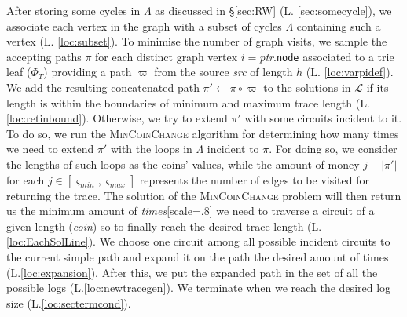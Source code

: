 \documentclass[acmengage]{acmart}
\newcommand{\smin}{\ensuremath{\varsigma_\textit{min}}}
\newcommand{\smax}{\ensuremath{\varsigma_\textit{max}}}
\begin{document}
After storing some cycles in $\Lambda$ as discussed in \S\ref{sec:RW} (L. \ref{sec:somecycle}), we associate each vertex in the graph with a subset of cycles $\Lambda$ containing such a vertex (L. \ref{loc:subset}). To minimise the number of graph visits, we sample the accepting paths $\pi$ for each distinct graph vertex $i=$\textit{ptr}.\texttt{node} associated to a trie leaf ($\Phi_T$) providing a path $\varpi$ from the source \textit{src} of length $h$ (L. \ref{loc:varpidef}). We add the resulting  concatenated path $\pi'\gets\pi\circ\varpi$ to the solutions in $\mathcal{L}$ if its length is within the boundaries of minimum and maximum trace length (L. \ref{loc:retinbound}). Otherwise, we try to extend $\pi'$ with some circuits incident to it. To do so, we run the \textsc{MinCoinChange} algorithm for determining how many times we need to extend $\pi'$ with the loops in $\Lambda$ incident to $\pi$. For doing so, we consider the lengths of such loops as the coins' values, while the amount of money $j-|\pi'|$  for each $j\in [\smin,\smax]$ represents the number of edges to be visited for returning the trace. The solution of the \textsc{MinCoinChange} problem will then return us the minimum amount of \textit{times}[scale=.8] we need to traverse a circuit of a given length (\textit{coin}) so to finally reach the desired trace length (L.\ref{loc:EachSolLine}). We choose one circuit among all possible incident circuits to the current simple path and expand it on the path the desired amount of times (L.\ref{loc:expansion}). After this, we put the expanded path in the set of all the possible logs (L.\ref{loc:newtracegen}). We terminate when we reach the desired log size (L.\ref{loc:sectermcond}).

 
\end{document}
